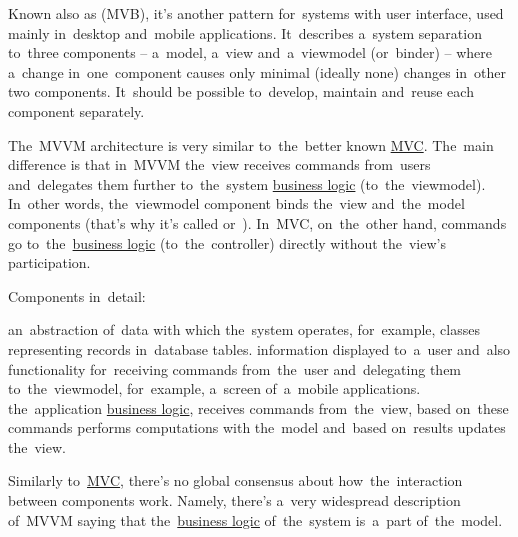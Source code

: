 \label{mvvm}
Known also as  (MVB), it's another pattern for~systems with user interface, used mainly in~desktop and~mobile applications.
It~describes a~system separation to~three components -- a~model, a~view and~a~viewmodel (or~binder) -- where a~change in~one~component causes only minimal (ideally none) changes in~other two components.
It~should be possible to~develop, maintain and~reuse each component separately.

The~MVVM architecture is very similar to~the~better known \hyperref[mvc]{MVC}.
The~main difference is that in~MVVM the~view receives commands from~users and~delegates them further to~the~system \hyperref[businesslogic]{business logic} (to~the~viewmodel).
In~other words, the~viewmodel component binds the~view and~the~model components (that's why it's called  \mbox{or }).
In~MVC, on~the~other hand, commands go to~the~\hyperref[businesslogic]{business logic} (to~the~controller) directly without the~view's participation.
\newline

\noindent Components in~detail:
\begin{itemize}
     an~abstraction of~data with which the~system operates, for~example, classes representing records in~database tables.
     information displayed to~a~user and~also functionality for~receiving commands from~the~user and~delegating them to~the~viewmodel, for~example, a~screen of~a~mobile applications.
     the~application \hyperref[businesslogic]{business logic}, receives commands from~the~view, based on~these commands performs computations with the~model and~based on~results updates the~view.
\end{itemize}

\warning Similarly to~\hyperref[mvc]{MVC}, there's no global consensus about how~the~interaction between components work.
Namely, there's a~very widespread description of~MVVM saying that the~\hyperref[businesslogic]{business logic} of~the~system is~a~part of~the~model.

